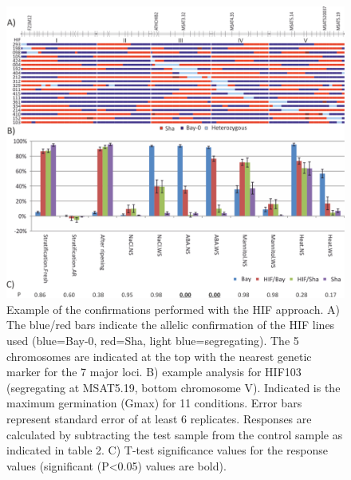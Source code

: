 \begin{figure}[h!]
  \centering
  \includegraphics[keepaspectratio,scale=0.30]{eps/image_3_1_8.eps}
  \caption[QTL confirmation.]{Example of the confirmations performed with the HIF approach. A) The blue/red bars 
          indicate the allelic confirmation of the HIF lines used (blue=Bay-0, red=Sha, light blue=segregating). 
          The 5 chromosomes are indicated at the top with the nearest genetic marker for the 7 major loci. B) example 
          analysis for HIF103 (segregating at MSAT5.19, bottom chromosome V). Indicated is the maximum germination 
          (Gmax) for 11 conditions. Error bars represent standard error of at least 6 replicates. Responses are 
          calculated by subtracting the test sample from the control sample as indicated in table 2. C) T-test 
          significance values for the response values (significant (P<0.05) values are bold).}
\end{figure}

